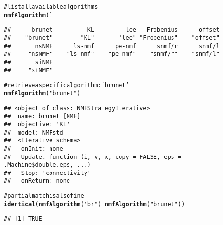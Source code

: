 \documentclass[a4paper]{article}\usepackage{graphicx, color}
\makeatletter
\newcommand{\hlfunctioncall}[1]{\textcolor[rgb]{0.501960784313725,0,0.329411764705882}{\textbf{#1}}}%
\newcommand{\hlstring}[1]{\textcolor[rgb]{0.6,0.6,1}{#1}}%
\newcommand{\hlcomment}[1]{\textcolor[rgb]{0.180392156862745,0.6,0.341176470588235}{#1}}%
\newenvironment{kframe}{%
 \def\at@end@of@kframe{}%
 \ifinner\ifhmode%
  \def\at@end@of@kframe{\end{minipage}}%
  \begin{minipage}{\columnwidth}%
 \fi\fi%
 \def\FrameCommand##1{\hskip\@totalleftmargin \hskip-\fboxsep
 \colorbox{shadecolor}{##1}\hskip-\fboxsep
     \hskip-\linewidth \hskip-\@totalleftmargin \hskip\columnwidth}%
 \MakeFramed {\advance\hsize-\width
   \@totalleftmargin\z@ \linewidth\hsize
   \@setminipage}}%
 {\par\unskip\endMakeFramed%
 \at@end@of@kframe}
\newenvironment{knitrout}{}{} %
\makeatother
\begin{document}
\begin{knitrout}
\color{fgcolor}\begin{kframe}
\begin{alltt}
\hlcomment{# list all available algorithms}
\hlfunctioncall{nmfAlgorithm}()
\end{alltt}
\begin{verbatim}
##      brunet          KL         lee   Frobenius      offset 
##    "brunet"        "KL"       "lee" "Frobenius"    "offset" 
##       nsNMF      ls-nmf      pe-nmf      snmf/r      snmf/l 
##     "nsNMF"    "ls-nmf"    "pe-nmf"    "snmf/r"    "snmf/l" 
##       siNMF 
##     "siNMF"
\end{verbatim}
\begin{alltt}
\hlcomment{# retrieve a specific algorithm: \hlstring{'brunet'}}
\hlfunctioncall{nmfAlgorithm}(\hlstring{"brunet"})
\end{alltt}
\begin{verbatim}
## <object of class: NMFStrategyIterative>
##  name: brunet [NMF]
##  objective: 'KL' 
##  model: NMFstd 
##  <Iterative schema>
##   onInit: none
##   Update: function (i, v, x, copy = FALSE, eps = .Machine$double.eps, ...)
##   Stop: 'connectivity'
##   onReturn: none
\end{verbatim}
\begin{alltt}
\hlcomment{# partial match is also fine}
\hlfunctioncall{identical}(\hlfunctioncall{nmfAlgorithm}(\hlstring{"br"}), \hlfunctioncall{nmfAlgorithm}(\hlstring{"brunet"}))
\end{alltt}
\begin{verbatim}
## [1] TRUE
\end{verbatim}
\end{kframe}
\end{knitrout}
\end{document}
